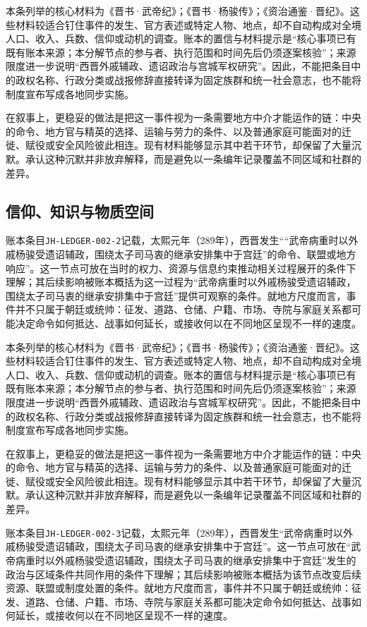 本条列举的核心材料为《晋书·武帝纪》；《晋书·杨骏传》；《资治通鉴·晋纪》。这些材料较适合钉住事件的发生、官方表述或特定人物、地点，却不自动构成对全境人口、收入、兵数、信仰或动机的调查。账本的置信与材料提示是“核心事项已有既有账本来源；本分解节点的参与者、执行范围和时间先后仍须逐案核验”；来源限度进一步说明“西晋外戚辅政、遗诏政治与宫城军权研究”。因此，不能把条目中的政权名称、行政分类或战报修辞直接转译为固定族群和统一社会意志，也不能将制度宣布写成各地同步实施。

在叙事上，更稳妥的做法是把这一事件视为一条需要地方中介才能运作的链：中央的命令、地方官与精英的选择、运输与劳力的条件、以及普通家庭可能面对的迁徙、赋役或安全风险彼此相连。现有材料能够显示其中若干环节，却保留了大量沉默。承认这种沉默并非放弃解释，而是避免以一条编年记录覆盖不同区域和社群的差异。

\subsection{信仰、知识与物质空间}

账本条目\texttt{JH-LEDGER-002-2}记载，太熙元年（289年），西晋发生““武帝病重时以外戚杨骏受遗诏辅政，围绕太子司马衷的继承安排集中于宫廷”的命令、联盟或地方响应”。这一节点可放在当时的权力、资源与信息约束推动相关过程展开的条件下理解；其后续影响被账本概括为这一过程为“武帝病重时以外戚杨骏受遗诏辅政，围绕太子司马衷的继承安排集中于宫廷”提供可观察的条件。就地方尺度而言，事件并不只属于朝廷或统帅：征发、道路、仓储、户籍、市场、寺院与家庭关系都可能决定命令如何抵达、战事如何延长，或接收何以在不同地区呈现不一样的速度。

本条列举的核心材料为《晋书·武帝纪》；《晋书·杨骏传》；《资治通鉴·晋纪》。这些材料较适合钉住事件的发生、官方表述或特定人物、地点，却不自动构成对全境人口、收入、兵数、信仰或动机的调查。账本的置信与材料提示是“核心事项已有既有账本来源；本分解节点的参与者、执行范围和时间先后仍须逐案核验”；来源限度进一步说明“西晋外戚辅政、遗诏政治与宫城军权研究”。因此，不能把条目中的政权名称、行政分类或战报修辞直接转译为固定族群和统一社会意志，也不能将制度宣布写成各地同步实施。

在叙事上，更稳妥的做法是把这一事件视为一条需要地方中介才能运作的链：中央的命令、地方官与精英的选择、运输与劳力的条件、以及普通家庭可能面对的迁徙、赋役或安全风险彼此相连。现有材料能够显示其中若干环节，却保留了大量沉默。承认这种沉默并非放弃解释，而是避免以一条编年记录覆盖不同区域和社群的差异。

账本条目\texttt{JH-LEDGER-002-3}记载，太熙元年（289年），西晋发生“武帝病重时以外戚杨骏受遗诏辅政，围绕太子司马衷的继承安排集中于宫廷”。这一节点可放在“武帝病重时以外戚杨骏受遗诏辅政，围绕太子司马衷的继承安排集中于宫廷”发生的政治与区域条件共同作用的条件下理解；其后续影响被账本概括为该节点改变后续资源、联盟或制度处置的条件。就地方尺度而言，事件并不只属于朝廷或统帅：征发、道路、仓储、户籍、市场、寺院与家庭关系都可能决定命令如何抵达、战事如何延长，或接收何以在不同地区呈现不一样的速度。

